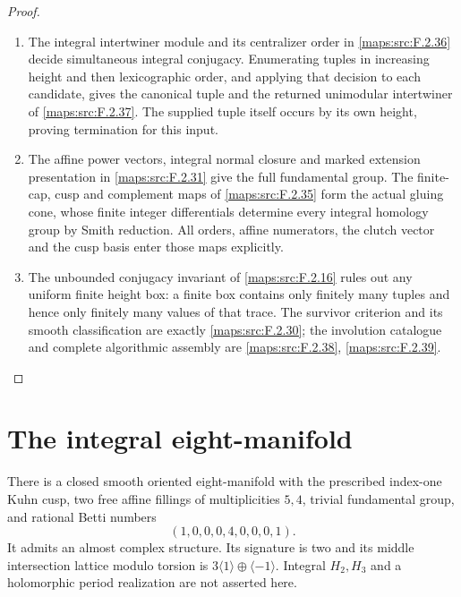 \begin{proof}
\begin{enumerate}[label=\arabic*.]
\item The integral intertwiner module and its centralizer order in
\cref{maps:src:F.2.36} decide simultaneous integral conjugacy. Enumerating
tuples in increasing height and then lexicographic order, and applying
that decision to each candidate, gives the canonical tuple and the
returned unimodular intertwiner of \cref{maps:src:F.2.37}. The supplied
tuple itself occurs by its own height, proving termination for this input.
\item The affine power vectors, integral normal closure and marked
extension presentation in \cref{maps:src:F.2.31} give the full fundamental
group. The finite-cap, cusp and complement maps of
\cref{maps:src:F.2.35} form the actual gluing cone, whose finite integer
differentials determine every integral homology group by Smith reduction.
All orders, affine numerators, the clutch vector and the cusp basis enter
those maps explicitly.
\item The unbounded conjugacy invariant of \cref{maps:src:F.2.16}
rules out any uniform finite height box: a finite box contains only
finitely many tuples and hence only finitely many values of that trace.
The survivor criterion and its smooth classification are exactly
\cref{maps:src:F.2.30}; the involution catalogue and complete algorithmic
assembly are \cref{maps:src:F.2.38}, \cref{maps:src:F.2.39}.
\end{enumerate}
\end{proof}



\section{The integral eight-manifold}



\begin{theorem}\label{maps:src:F.2.5}


There is a closed smooth oriented eight-manifold with the prescribed
index-one Kuhn cusp, two free affine fillings of multiplicities $5,4$,
trivial fundamental group, and rational Betti numbers
\[
 (1,0,0,0,4,0,0,0,1). \tag{F.5}\label{maps:eq:F.5}
\]
It admits an almost complex structure.  Its signature is two and
its middle intersection lattice modulo torsion is
$3\langle1\rangle\oplus\langle-1\rangle$.
Integral $H_2,H_3$ and a holomorphic period realization are not
asserted here.

\end{theorem}


